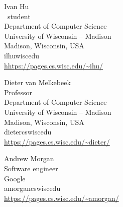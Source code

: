 \documentclass{toc}
\begin{document}
%
%
%
%
%
\begin{tocauthors}
\begin{tocinfo}[hu]
 Ivan Hu\\
 \phd\ student\\
 Department of Computer Science\\
 University of Wisconsin -- Madison\\
 Madison, Wisconsin, USA\\
 ilhu\tocat{}wisc\tocdot{}edu\\           %
 \url{hhtps://pages.cs.wisc.edu/~ihu/}    %
\end{tocinfo}
\begin{tocinfo}[vanmelkebeek]
 Dieter van Melkebeek\\
 Professor\\
 Department of Computer Science\\
 University of Wisconsin -- Madison\\
 Madison, Wisconsin, USA\\
 dieter\tocat{}cs\tocdot{}wisc\tocdot{}edu \\   %
 \url{https://pages.cs.wisc.edu/~dieter/}      %
\end{tocinfo}
\begin{tocinfo}[morgan]
 Andrew Morgan\\
 Software engineer \\                 %
 Google \\                            %
%
%
%
%
 amorgan\tocat{}cs\tocdot{}wisc\tocdot{}edu \\%
 \url{https://pages.cs.wisc.edu/~amorgan/}    %
\end{tocinfo}
\end{tocauthors}
\end{document}
